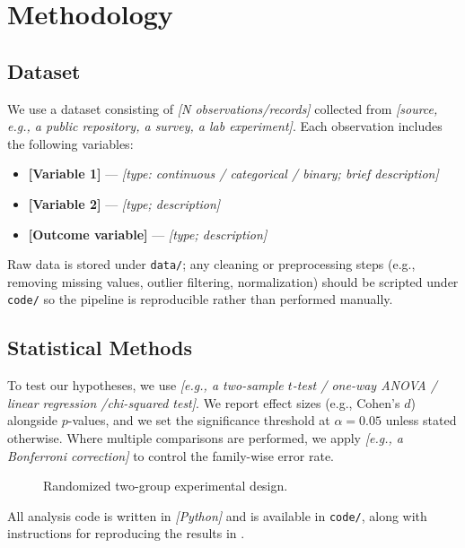 \section{Methodology}
\label{S:methodology}


\subsection{Dataset}\label{SS:dataset}


We use a dataset consisting of \textit{[N observations/records]} collected from \textit{[source, e.g., a public repository, a survey, a lab experiment]}. Each observation includes the following variables:

\begin{itemize}
    \item \textbf{[Variable 1]} --- \textit{[type: continuous / categorical
    / binary; brief description]}
    \item \textbf{[Variable 2]} --- \textit{[type; description]}
    \item \textbf{[Outcome variable]} --- \textit{[type; description]}
\end{itemize}

Raw data is stored under \texttt{data/}; any cleaning or preprocessing steps (e.g., removing missing values, outlier filtering, normalization) should be scripted under \texttt{code/} so the pipeline is reproducible rather than performed manually.



\subsection{Statistical Methods}

To test our hypotheses, we use \textit{[e.g., a two-sample $t$-test / one-way ANOVA / linear regression /chi-squared test]}. We report effect sizes (e.g., Cohen's $d$) alongside $p$-values, and we set the significance threshold at $\alpha = 0.05$ unless stated otherwise. Where multiple comparisons are performed, we apply \textit{[e.g., a Bonferroni correction]} to control the family-wise error rate.

\begin{figure}[H]
    \centering
    
    \caption{Randomized two-group experimental design.}
    \label{F:rct-design}
\end{figure}

All analysis code is written in \textit{[Python]} and is available in \texttt{code/}, along with instructions for reproducing the results in .